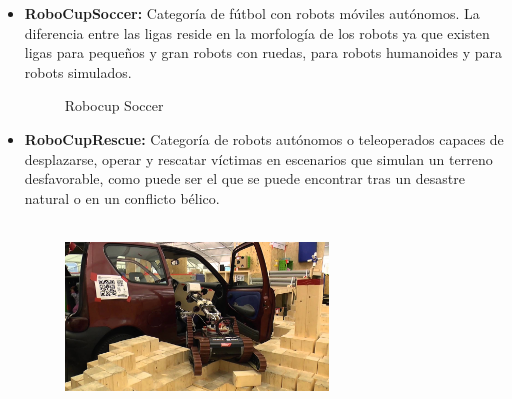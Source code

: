 \begin{itemize}
  \item \textbf{RoboCupSoccer:} Categoría de fútbol con robots móviles autónomos. La diferencia entre las ligas reside en la morfología de los robots ya que existen ligas para pequeños y gran robots con ruedas, para robots humanoides y para robots simulados.
\begin{figure}[H]
  \begin{center}
  \end{center}
  \caption{Robocup Soccer}
  \label{fig:maps-ej}
\end{figure}
  \item \textbf{RoboCupRescue:} Categoría de robots autónomos o teleoperados capaces de desplazarse, operar y rescatar víctimas en escenarios que simulan un terreno desfavorable, como puede ser el que se puede encontrar tras un desastre natural o en un conflicto bélico.
  \begin{figure}[H]  
  \begin{center}
    \includegraphics[width=7cm,height=5cm]{img/cap1/robocup-rescue}

\end{center}
\end{figure}
\end{itemize}

